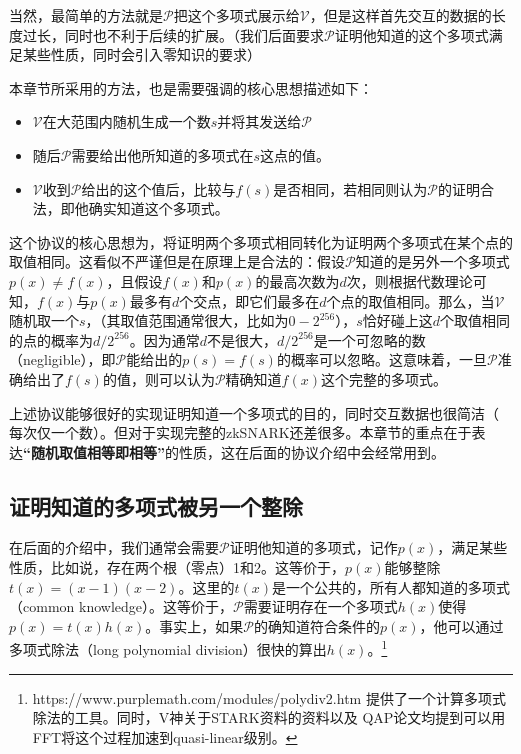 \documentclass[12pt]{article}
\newcommand{\zk}{zkSNARK}
\newcommand{\pp}{$\mathcal{P}$}
\newcommand{\vv}{$\mathcal{V}$}
\begin{document}
当然，最简单的方法就是\pp 把这个多项式展示给\vv，但是这样首先交互的数据的长度过长，同时也不利于后续的扩展。（我们后面要求\pp 证明他知道的这个多项式满足某些性质，同时会引入零知识的要求）

本章节所采用的方法，也是需要强调的核心思想描述如下：
\begin{itemize}
	\item \vv 在大范围内随机生成一个数$s$并将其发送给\pp
	\item 随后\pp 需要给出他所知道的多项式在$s$这点的值。
	\item \vv 收到\pp 给出的这个值后，比较与$f(s)$是否相同，若相同则认为\pp 的证明合法，即他确实知道这个多项式。
\end{itemize}

这个协议的核心思想为，将证明两个多项式相同转化为证明两个多项式在某个点的取值相同。这看似不严谨但是在原理上是合法的：假设\pp 知道的是另外一个多项式$p(x)\neq f(x)$，且假设$f(x)$和$p(x)$的最高次数为$d$次，则根据代数理论可知，$f(x)$与$p(x)$最多有$d$个交点，即它们最多在$d$个点的取值相同。那么，当\vv 随机取一个$s$，（其取值范围通常很大，比如为$0-2^{256}$），$s$恰好碰上这$d$个取值相同的点的概率为$d/2^{256}$。因为通常$d$不是很大，$d/2^{256}$是一个可忽略的数（negligible），即\pp 能给出的$p(s)=f(s)$的概率可以忽略。这意味着，一旦\pp 准确给出了$f(s)$的值，则可以认为\pp 精确知道$f(x)$这个完整的多项式。

上述协议能够很好的实现证明知道一个多项式的目的，同时交互数据也很简洁（ 每次仅一个数）。但对于实现完整的\zk 还差很多。本章节的重点在于表达\textbf{“随机取值相等即相等”}的性质，这在后面的协议介绍中会经常用到。
\subsection{证明知道的多项式被另一个整除}
\label{sec:div}
在后面的介绍中，我们通常会需要\pp 证明他知道的多项式，记作$p(x)$，满足某些性质，比如说，存在两个根（零点）1和2。这等价于，$p(x)$能够整除$t(x)=(x-1)(x-2)$。这里的$t(x)$是一个公共的，所有人都知道的多项式（common knowledge）。这等价于，\pp 需要证明存在一个多项式$h(x)$使得$p(x)=t(x)h(x)$。事实上，如果\pp 的确知道符合条件的$p(x)$，他可以通过多项式除法（long polynomial division）很快的算出$h(x)$。\footnote{https://www.purplemath.com/modules/polydiv2.htm 提供了一个计算多项式除法的工具。同时，V神关于STARK资料的资料以及	QAP论文均提到{\color{red}可以用FFT将这个过程加速到quasi-linear级别。}}
\end{document}
